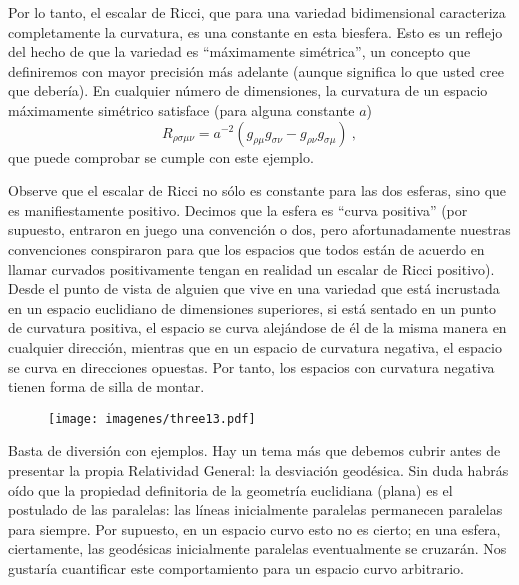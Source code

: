 \documentclass[11pt,b5paper,openany,twoside]{book}
\begin{document}
Por lo tanto, el escalar de Ricci, que para una variedad bidimensional caracteriza completamente la curvatura, es una constante en esta biesfera.
Esto es un reflejo del hecho de que la variedad es ``máximamente simétrica'', un concepto que definiremos con mayor precisión más adelante (aunque significa lo que usted cree que debería).
En cualquier número de dimensiones, la curvatura de un espacio máximamente simétrico satisface (para alguna constante $a$)
\begin{equation}
R_{\rho\sigma\mu\nu} = a^{-2}(g_{\rho\mu}g_{\sigma\nu}
- g_{\rho\nu}g_{\sigma\mu})\ ,\label{3.106}
\end{equation}
que puede comprobar se cumple con este ejemplo.

Observe que el escalar de Ricci no sólo es constante para las dos esferas, sino que es manifiestamente positivo.
Decimos que la esfera es ``curva positiva'' (por supuesto, entraron en juego una convención o dos, pero afortunadamente nuestras convenciones conspiraron para que los espacios que todos están de acuerdo en llamar curvados positivamente tengan en realidad un escalar de Ricci positivo).
Desde el punto de vista de alguien que vive en una variedad que está incrustada en un espacio euclidiano de dimensiones superiores, si está sentado en un punto de curvatura positiva, el espacio se curva alejándose de él de la misma manera en cualquier dirección, mientras que en un espacio de curvatura negativa, el espacio se curva en direcciones opuestas.
Por tanto, los espacios con curvatura negativa tienen forma de silla de montar.

\begin{figure}[h]
\centering
\texttt{[image: imagenes/three13.pdf]}
\end{figure}

Basta de diversión con ejemplos.
Hay un tema más que debemos cubrir antes de presentar la propia Relatividad General: la desviación geodésica.
Sin duda habrás oído que la propiedad definitoria de la geometría euclidiana (plana) es el postulado de las paralelas: las líneas inicialmente paralelas permanecen paralelas para siempre.
Por supuesto, en un espacio curvo esto no es cierto; en una esfera, ciertamente, las geodésicas inicialmente paralelas eventualmente se cruzarán.
Nos gustaría cuantificar este comportamiento para un espacio curvo arbitrario.
\end{document}
